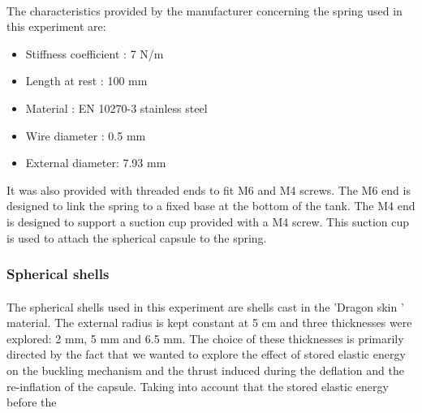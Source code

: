 \paragraph{}
The characteristics provided by the manufacturer concerning the spring used in this experiment are:
\
\begin{itemize}
	\item Stiffness coefficient : 7 N/m
	\item Length at rest : 100 mm 
	\item Material : EN 10270-3 stainless steel
	\item Wire diameter : 0.5 mm
	\item External diameter: 7.93 mm
\end{itemize}

It was also provided with threaded ends to fit M6 and M4 screws. The M6 end is designed to link the spring to a fixed base at the bottom of the tank. The M4 end is designed to support a suction cup provided with a M4 screw. This suction cup is used to attach the spherical capsule to the spring.


\subsubsection{Spherical shells}
\paragraph{}
The spherical shells used in this experiment are shells cast in the 'Dragon skin ' material. The external radius is kept constant at 5 cm and three thicknesses were explored: 2 mm, 5 mm and 6.5 mm. The choice of these thicknesses is primarily directed by the fact that we wanted to explore the effect of stored elastic energy on the buckling mechanism and the thrust induced during the deflation and the re-inflation of the capsule. Taking into account that the stored elastic energy before the 